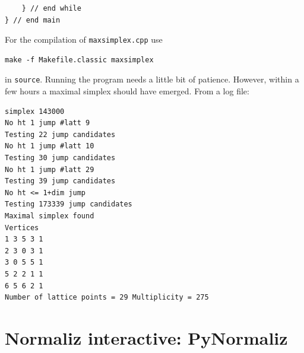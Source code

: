 \begin{small}
\begin{Verbatim}
    } // end while
} // end main
\end{Verbatim}

For the compilation of \verb|maxsimplex.cpp| use
\begin{Verbatim}
make -f Makefile.classic maxsimplex
\end{Verbatim}
in \verb|source|. Running the program needs a little bit of patience. However, within a few hours a maximal simplex should have emerged. From a log file:
\begin{Verbatim}
simplex 143000
No ht 1 jump #latt 9
Testing 22 jump candidates
No ht 1 jump #latt 10
Testing 30 jump candidates
No ht 1 jump #latt 29
Testing 39 jump candidates
No ht <= 1+dim jump
Testing 173339 jump candidates
Maximal simplex found
Vertices
1 3 5 3 1
2 3 0 3 1
3 0 5 5 1
5 2 2 1 1
6 5 6 2 1
Number of lattice points = 29 Multiplicity = 275
\end{Verbatim}

\end{small}

\newpage

\section{Normaliz interactive: PyNormaliz}\label{PyNormaliz}

